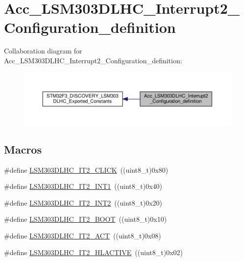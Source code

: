 \hypertarget{group__Acc__LSM303DLHC__Interrupt2__Configuration__definition}{\section{Acc\+\_\+\+L\+S\+M303\+D\+L\+H\+C\+\_\+\+Interrupt2\+\_\+\+Configuration\+\_\+definition}
\label{group__Acc__LSM303DLHC__Interrupt2__Configuration__definition}
}
Collaboration diagram for Acc\+\_\+\+L\+S\+M303\+D\+L\+H\+C\+\_\+\+Interrupt2\+\_\+\+Configuration\+\_\+definition\+:\nopagebreak
\begin{figure}[H]
\begin{center}
\leavevmode
\includegraphics[width=350pt]{group__Acc__LSM303DLHC__Interrupt2__Configuration__definition}
\end{center}
\end{figure}
\subsection*{Macros}
\begin{DoxyCompactItemize}
\item 
\#define \hyperlink{group__Acc__LSM303DLHC__Interrupt2__Configuration__definition_gac361bbc934988ae736ee0aaaaede2f52}{L\+S\+M303\+D\+L\+H\+C\+\_\+\+I\+T2\+\_\+\+C\+L\+I\+C\+K}~((uint8\+\_\+t)0x80)
\item 
\#define \hyperlink{group__Acc__LSM303DLHC__Interrupt2__Configuration__definition_ga9eacdaf8dbb30d08f683d3174a10be59}{L\+S\+M303\+D\+L\+H\+C\+\_\+\+I\+T2\+\_\+\+I\+N\+T1}~((uint8\+\_\+t)0x40)
\item 
\#define \hyperlink{group__Acc__LSM303DLHC__Interrupt2__Configuration__definition_gab470e6565de527c5822908181f7f1f0d}{L\+S\+M303\+D\+L\+H\+C\+\_\+\+I\+T2\+\_\+\+I\+N\+T2}~((uint8\+\_\+t)0x20)
\item 
\#define \hyperlink{group__Acc__LSM303DLHC__Interrupt2__Configuration__definition_gae267f0176fb20ddaba9b037b46c5b540}{L\+S\+M303\+D\+L\+H\+C\+\_\+\+I\+T2\+\_\+\+B\+O\+O\+T}~((uint8\+\_\+t)0x10)
\item 
\#define \hyperlink{group__Acc__LSM303DLHC__Interrupt2__Configuration__definition_ga9d67ac5cc2f5aff7674240b5e65b04a0}{L\+S\+M303\+D\+L\+H\+C\+\_\+\+I\+T2\+\_\+\+A\+C\+T}~((uint8\+\_\+t)0x08)
\item 
\#define \hyperlink{group__Acc__LSM303DLHC__Interrupt2__Configuration__definition_ga58f03233793a3db59bb88ed25850b000}{L\+S\+M303\+D\+L\+H\+C\+\_\+\+I\+T2\+\_\+\+H\+L\+A\+C\+T\+I\+V\+E}~((uint8\+\_\+t)0x02)
\end{DoxyCompactItemize}


